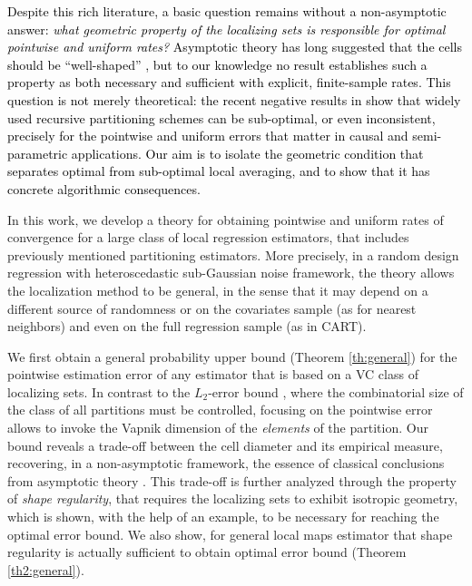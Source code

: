 \documentclass[paper=a4, fontsize=11pt]{scrartcl}
\newcommand{\rev}[1]{\textcolor{black}{#1}}
\begin{document}
%
%
\rev{Despite this rich literature, a basic question remains without a non-asymptotic answer: \emph{what geometric property of the localizing sets is responsible for optimal pointwise and uniform rates?} Asymptotic theory has long suggested that the cells should be ``well-shaped'' \cite{gyorfi2006distribution}, but to our knowledge no result establishes such a property as both necessary and sufficient with explicit, finite-sample rates. This question is not merely theoretical: the recent negative results in \cite{cattaneo2022pointwise} show that widely used recursive partitioning schemes can be sub-optimal, or even inconsistent, precisely for the pointwise and uniform errors that matter in causal and semi-parametric applications. Our aim is to isolate the geometric condition that separates optimal from sub-optimal local averaging, and to show that it has concrete algorithmic consequences.}

In this work, we develop a theory for obtaining pointwise and uniform rates of convergence for a large class of local regression estimators, that includes previously mentioned partitioning estimators. More precisely, in a random design regression with heteroscedastic sub-Gaussian noise framework, the theory allows the localization method to be general, in the sense that it may depend on a different source of randomness or on the covariates sample (as for nearest neighbors) and even on the full regression sample (as in CART). 

We first obtain a general probability upper bound (Theorem \ref{th:general}) for the pointwise estimation error of any estimator that is based on a VC class of localizing sets. In contrast to the $L_2$-error bound \cite{lugosinobel}, where the combinatorial size of the class of all partitions must be controlled, focusing on the pointwise error allows to invoke the Vapnik dimension of the \textit{elements} of the partition.
Our bound reveals a trade-off between the cell diameter and its empirical measure, recovering, in a non-asymptotic framework, the essence of classical conclusions from asymptotic theory \cite{gyorfi2006distribution}. This trade-off is further analyzed through the property of \textit{shape regularity}, that requires the localizing sets to exhibit isotropic geometry, which is shown, with the help of an example, to be necessary for reaching the optimal error bound. We also show, for general local maps estimator that shape regularity is actually sufficient to obtain optimal error bound (Theorem \ref{th2:general}).
\end{document}
